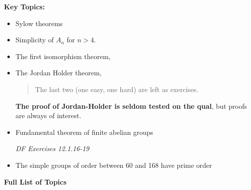 \textbf{Key Topics:}

\begin{itemize}
\item
  Sylow theorems
\item
  Simplicity of \(A_n\) for \(n > 4\).
\item
  The first isomorphism theorem,
\item
  The Jordan Holder theorem,

  \begin{quote}
  The last two (one easy, one hard) are left as exercises.
  \end{quote}

  \textbf{The proof of Jordan-Holder is seldom tested on the qual}, but
  proofs are always of interest.
\item
  Fundamental theorem of finite abelian groups

  \emph{DF Exercises 12.1.16-19}
\item
  The simple groups of order between 60 and 168 have prime order
\end{itemize}

\textbf{Full List of Topics}

